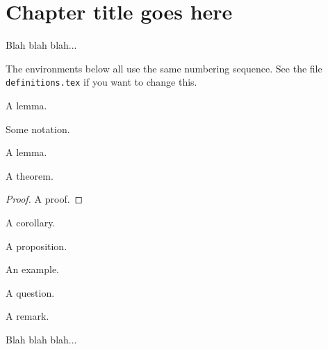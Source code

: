 
\chapter{Chapter title goes here}
\label{chapter1}



Blah blah blah...

The environments below all use the same numbering sequence.  See
the file \verb+definitions.tex+ if you want to change this.

\begin{defn}
A lemma.
\end{defn}

\begin{notn}
Some notation.
\end{notn}

\begin{lemma}
A lemma.
\end{lemma}

\begin{theorem}
A theorem.
\end{theorem}

\begin{proof}
A proof.
\end{proof}

\begin{cor}
A corollary.
\end{cor}

\begin{prop}
A proposition.
\end{prop}

\begin{ex}
An example.
\end{ex}

\begin{question}
A question.
\end{question}

\begin{remark}
A remark.
\end{remark}


\newpage

Blah blah blah...

